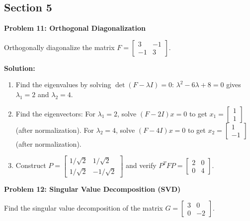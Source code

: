 \documentclass[8pt, a4paper, landscape]{extarticle}
\begin{document}
\begin{multicols*}{3}
  \columnbreak

  \section*{Section 5}

  \textbf{Problem 11: Orthogonal Diagonalization}

  Orthogonally diagonalize the matrix $F = \begin{bmatrix} 3 & -1 \\ -1 & 3 \end{bmatrix}$.

  \textbf{Solution:}
  \begin{enumerate}
    \item Find the eigenvalues by solving $\det(F - \lambda I) = 0$: $\lambda^2 - 6\lambda + 8 = 0$ gives $\lambda_1 = 2$ and $\lambda_2 = 4$.
    \item Find the eigenvectors: For $\lambda_1 = 2$, solve $(F - 2I)x = 0$ to get $x_1 = \begin{bmatrix} 1 \\ 1 \end{bmatrix}$ (after normalization). For $\lambda_2 = 4$, solve $(F - 4I)x = 0$ to get $x_2 = \begin{bmatrix} 1 \\ -1 \end{bmatrix}$ (after normalization).
    \item Construct $P = \begin{bmatrix} 1/\sqrt{2} & 1/\sqrt{2} \\ 1/\sqrt{2} & -1/\sqrt{2} \end{bmatrix}$ and verify $P^T F P = \begin{bmatrix} 2 & 0 \\ 0 & 4 \end{bmatrix}$.
  \end{enumerate}


  \textbf{Problem 12: Singular Value Decomposition (SVD)}

  Find the singular value decomposition of the matrix $G = \begin{bmatrix} 3 & 0 \\ 0 & -2 \end{bmatrix}$.


\end{multicols*}
\end{document}
